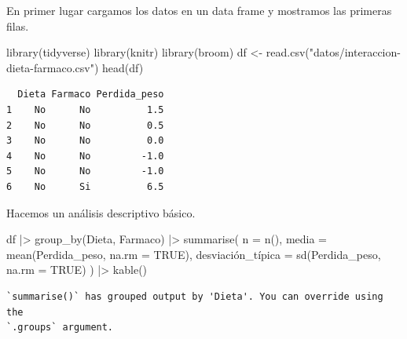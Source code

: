 \documentclass[
  spanish,
  a4paper,
]{scrreport}
\newenvironment{Shaded}{\begin{snugshade}}{\end{snugshade}}
\newcommand{\AttributeTok}[1]{\textcolor[rgb]{0.40,0.45,0.13}{#1}}
\newcommand{\ConstantTok}[1]{\textcolor[rgb]{0.56,0.35,0.01}{#1}}
\newcommand{\FunctionTok}[1]{\textcolor[rgb]{0.28,0.35,0.67}{#1}}
\newcommand{\NormalTok}[1]{\textcolor[rgb]{0.00,0.23,0.31}{#1}}
\newcommand{\OtherTok}[1]{\textcolor[rgb]{0.00,0.23,0.31}{#1}}
\newcommand{\SpecialCharTok}[1]{\textcolor[rgb]{0.37,0.37,0.37}{#1}}
\newcommand{\StringTok}[1]{\textcolor[rgb]{0.13,0.47,0.30}{#1}}
\theoremstyle{definition}
\theoremstyle{remark}
\begin{document}
\begin{tcolorbox}[enhanced jigsaw, arc=.35mm, bottomrule=.15mm, bottomtitle=1mm, breakable, colback=white, colbacktitle=quarto-callout-tip-color!10!white, colframe=quarto-callout-tip-color-frame, coltitle=black, left=2mm, leftrule=.75mm, opacityback=0, opacitybacktitle=0.6, rightrule=.15mm, title=\textcolor{quarto-callout-tip-color}{\faLightbulb}\hspace{0.5em}{Solución}, titlerule=0mm, toprule=.15mm, toptitle=1mm]

En primer lugar cargamos los datos en un data frame y mostramos las
primeras filas.

\begin{Shaded}
\begin{Highlighting}[]
\FunctionTok{library}\NormalTok{(tidyverse)}
\FunctionTok{library}\NormalTok{(knitr)}
\FunctionTok{library}\NormalTok{(broom)}
\NormalTok{df }\OtherTok{\textless{}{-}} \FunctionTok{read.csv}\NormalTok{(}\StringTok{"datos/interaccion{-}dieta{-}farmaco.csv"}\NormalTok{)}
\FunctionTok{head}\NormalTok{(df)}
\end{Highlighting}
\end{Shaded}

\begin{verbatim}
  Dieta Farmaco Perdida_peso
1    No      No          1.5
2    No      No          0.5
3    No      No          0.0
4    No      No         -1.0
5    No      No         -1.0
6    No      Si          6.5
\end{verbatim}

Hacemos un análisis descriptivo básico.

\begin{Shaded}
\begin{Highlighting}[]
\NormalTok{df }\SpecialCharTok{|\textgreater{}} 
    \FunctionTok{group\_by}\NormalTok{(Dieta, Farmaco) }\SpecialCharTok{|\textgreater{}} 
    \FunctionTok{summarise}\NormalTok{(}
        \AttributeTok{n =} \FunctionTok{n}\NormalTok{(),}
        \AttributeTok{media =} \FunctionTok{mean}\NormalTok{(Perdida\_peso, }\AttributeTok{na.rm =} \ConstantTok{TRUE}\NormalTok{),}
\NormalTok{        desviación\_típica }\OtherTok{=} \FunctionTok{sd}\NormalTok{(Perdida\_peso, }\AttributeTok{na.rm =} \ConstantTok{TRUE}\NormalTok{)}
\NormalTok{    ) }\SpecialCharTok{|\textgreater{}} 
    \FunctionTok{kable}\NormalTok{()}
\end{Highlighting}
\end{Shaded}

\begin{verbatim}
`summarise()` has grouped output by 'Dieta'. You can override using the
`.groups` argument.
\end{verbatim}


\end{tcolorbox}
\end{document}
